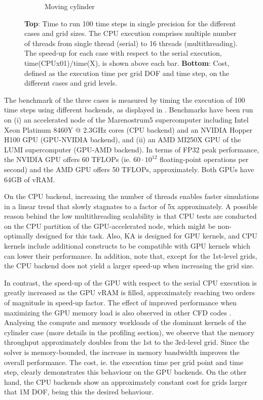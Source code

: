 \documentclass[10pt,a4paper]{article}
\begin{document}
\begin{figure}[!t]
\begin{subfigure}[t]{0.32\linewidth}
    \caption{Moving cylinder\hspace*{-1em}}
  \end{subfigure}
	\caption{\textbf{Top}: Time to run 100 time steps in single precision for the different cases and grid sizes. The CPU execution comprises multiple number of threads from single thread (serial) to 16 threads (multithreading). The speed-up for each case with respect to the serial execution, time(CPUx01)/time(X), is shown above each bar. \textbf{Bottom}: Cost, defined as the execution time per grid DOF and time step, on the different cases and grid levels.}
	\label{fig:benchmarks}
\end{figure}

The benchmark of the three cases is measured by timing the execution of 100 time steps using different backends, as displayed in . Benchmarks have been run on (i) an accelerated node of the Marenostrum5 supercomputer including Intel Xeon Platinum 8460Y @ 2.3GHz cores (CPU backend) and an NVIDIA Hopper H100 GPU (GPU-NVIDIA backend), and (ii) an AMD MI250X GPU of the LUMI supercomputer (GPU-AMD backend). In terms of FP32 peak performance, the NVIDIA GPU offers 60 TFLOPs (ie. $60\cdot10^{12}$ floating-point operations per second) and the AMD GPU offers 50 TFLOPs, approximately. Both GPUs have 64GB of vRAM.

On the CPU backend, increasing the number of threads enables faster simulations in a linear trend that slowly stagnates to a factor of 5x approximately. A possible reason behind the low multithreading scalability is that CPU tests are conducted on the CPU partition of the GPU-accelerated node, which might be non-optimally designed for this task. Also, KA is designed for GPU kernels, and CPU kernels include additional constructs to be compatible with GPU kernels which can lower their performance. In addition, note that, except for the 1st-level grids, the CPU backend does not yield a larger speed-up when increasing the grid size.

In contrast, the speed-up of the GPU with respect to the serial CPU execution is greatly increased as the GPU vRAM is filled, approximately reaching two orders of magnitude in speed-up factor. The effect of improved performance when maximizing the GPU memory load is also observed in other CFD codes \citep{Kempf2024,Gasparino2024}. Analysing the compute and memory workloads of the dominant kernels of the cylinder case (more details in the profiling section), we observe that the memory throughput approximately doubles from the 1st to the 3rd-level grid. Since the solver is memory-bounded, the increase in memory bandwidth improves the overall performance. The cost, ie. the execution time per grid point and time step, clearly demonstrates this behaviour on the GPU backends. On the other hand, the CPU backends show an approximately constant cost for grids larger that 1M DOF, being this the desired behaviour.
\end{document}
